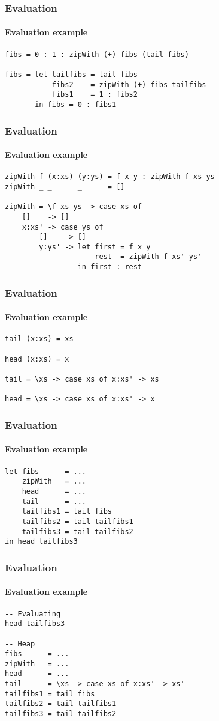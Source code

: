 \documentclass{beamer}
\begin{document}
\begin{frame}[fragile]
\frametitle{Evaluation}
\framesubtitle{Evaluation example}

\begin{verbatim}
fibs = 0 : 1 : zipWith (+) fibs (tail fibs)

fibs = let tailfibs = tail fibs
           fibs2    = zipWith (+) fibs tailfibs
           fibs1    = 1 : fibs2
       in fibs = 0 : fibs1
\end{verbatim}
\end{frame}

\begin{frame}[fragile]
\frametitle{Evaluation}
\framesubtitle{Evaluation example}

\begin{verbatim}
zipWith f (x:xs) (y:ys) = f x y : zipWith f xs ys
zipWith _ _      _      = []

zipWith = \f xs ys -> case xs of
    []    -> []
    x:xs' -> case ys of
        []    -> []
        y:ys' -> let first = f x y
                     rest  = zipWith f xs' ys'   
                 in first : rest
\end{verbatim}
\end{frame}


\begin{frame}[fragile]
\frametitle{Evaluation}
\framesubtitle{Evaluation example}

\begin{verbatim}
tail (x:xs) = xs

head (x:xs) = x

tail = \xs -> case xs of x:xs' -> xs

head = \xs -> case xs of x:xs' -> x
\end{verbatim}
\end{frame}


\begin{frame}[t,fragile]
\frametitle{Evaluation}
\framesubtitle{Evaluation example}
\begin{verbatim}
let fibs      = ...
    zipWith   = ...
    head      = ...
    tail      = ...
    tailfibs1 = tail fibs
    tailfibs2 = tail tailfibs1
    tailfibs3 = tail tailfibs2
in head tailfibs3
\end{verbatim}
\end{frame}

\begin{frame}[t,fragile]
\frametitle{Evaluation}
\framesubtitle{Evaluation example}
\begin{verbatim}
-- Evaluating
head tailfibs3

-- Heap
fibs      = ...
zipWith   = ...
head      = ...
tail      = \xs -> case xs of x:xs' -> xs'
tailfibs1 = tail fibs
tailfibs2 = tail tailfibs1
tailfibs3 = tail tailfibs2
\end{verbatim}
\end{frame}
\end{document}
